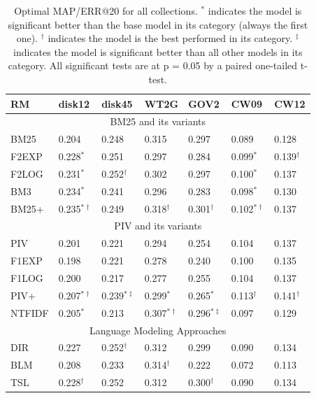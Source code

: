 \begin{table}[t]
\centering
\cprotect\caption{Optimal MAP/ERR@20 for all collections. 
$^*$ indicates the model is significant better than the base  
model in its category (always the first one).
$^\dagger$ indicates the model is the best performed in its 
category.
$^\ddagger$ indicates the model is significant better than 
all other models in its category.
All significant tests are at p = 0.05 by a paired one-tailed t-test.
}
\label{tab:r2}
\begin{tabular}{ |l||l||l||l||l||l||l| } \hline
\textbf{RM} & \textbf{disk12} & \textbf{disk45} & \textbf{WT2G} & \textbf{GOV2} & \textbf{CW09} & \textbf{CW12} \\ \hline \hline 
\multicolumn{7}{|c|}{BM25 and its variants} \\ \hline 
BM25 & 0.204 & 0.248 & 0.315 & 0.297 & 0.089 & 0.128 \\ \hline
F2EXP & 0.228$^*$ & 0.251 & 0.297 & 0.284 & 0.099$^*$ & 0.139$^{\dagger}$ \\ \hline
F2LOG & 0.231$^*$ & 0.252$^{\dagger}$ & 0.302 & 0.297 & 0.100$^*$ & 0.137 \\ \hline
BM3 & 0.234$^*$ & 0.241 & 0.296 & 0.283 & 0.098$^*$ & 0.130 \\ \hline
BM25+ & 0.235$^{*\dagger}$ & 0.249 & 0.318$^{\dagger}$ & 0.301$^{\dagger}$ & 0.102$^{*\dagger}$ & 0.137 \\ \hline
\hline
\multicolumn{7}{|c|}{PIV and its variants} \\ \hline 
PIV & 0.201 & 0.221 & 0.294 & 0.254 & 0.104 & 0.137 \\ \hline
F1EXP & 0.198 & 0.221 & 0.278 & 0.240 & 0.100 & 0.135 \\ \hline
F1LOG & 0.200 & 0.217 & 0.277 & 0.255 & 0.104 & 0.137 \\ \hline
PIV+ & 0.207$^{*\dagger}$ & 0.239$^{*\ddagger}$ & 0.299$^*$ & 0.265$^*$ & 0.113$^{\dagger}$ & 0.141$^{\dagger}$ \\ \hline
NTFIDF & 0.205$^*$ & 0.213 & 0.307$^{*\dagger}$ & 0.296$^{*\ddagger}$ & 0.097 & 0.129 \\ \hline
\hline 
\multicolumn{7}{|c|}{Language Modeling Approaches} \\ \hline 
DIR & 0.227 & 0.252$^{\dagger}$ & 0.312 & 0.299 & 0.090 & 0.134 \\ \hline
BLM & 0.208 & 0.233 & 0.314$^{\dagger}$ & 0.222 & 0.072 & 0.113 \\ \hline
TSL & 0.228$^{\dagger}$ & 0.252 & 0.312 & 0.300$^{\dagger}$ & 0.090 & 0.134 \\ \hline

\end{tabular}
\end{table}
